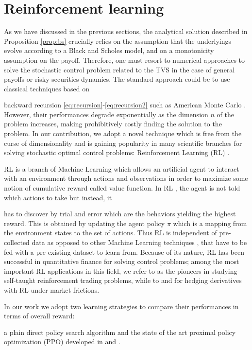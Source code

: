 \documentclass[runningheads]{m2ef}
\newcommand\soutpars[1]{\let\helpcmd\sout\parhelp#1\par\relax\relax}
\newcommand{\change}[1]{{\color{red} {#1}}}%
\newcommand{\remove}[1]{{\color{red} \soutpars{{#1}}}}%
\begin{document}
\section{Reinforcement learning}\label{sec:RL}
As we have discussed in the previous sections, \change{the analytical solution described in Proposition \ref{prop:bs} crucially relies on the assumption that the underlyings evolve according to a Black and Scholes model, and on a monotonicity assumption on the payoff. Therefore,}
one must resort to numerical approaches to solve the stochastic control problem related to the TVS in the case of general payoffs or risky securities dynamics. The standard approach could be to use classical techniques based on \remove{backwards} \change{backward} recursion \eqref{eq:recursion}-\eqref{eq:recursion2} such as American Monte Carlo \cite{Longstaff2001}. However, their performances degrade exponentially as the dimension $n$ of the problem increases, making prohibitively costly finding the solution to the problem. In our contribution, we adopt a novel technique which is free from the curse of dimensionality and is gaining popularity in many scientific branches for solving stochastic optimal control problems: Reinforcement Learning (RL) \cite{Sutton2018}. 

\remove{Reinforcement Learning} \change{RL} is a branch of Machine Learning which allows an artificial agent to interact with an environment through actions and observations in order to maximize some notion of cumulative reward \change{called value function}. In RL\change{,} the agent is not told which actions to take but instead, it \remove{must} \change{has to} discover by trial and error which are the behaviors  yielding the highest reward. This is obtained by updating the agent policy $\pi$ which is a mapping from the environment states to the set of actions. Thus RL is independent of pre-collected data as opposed to other Machine Learning techniques\change{, that have to be fed with a pre-existing dataset to learn from}. Because of its nature, RL has been successful in quantitative finance for solving control problems; among the most important RL applications in this field, we refer to \cite{Deng2017} as the pioneers in studying self-taught reinforcement trading problems, while to \cite{Halperin2020} and \cite{Kolm2019} for hedging derivatives with RL under market frictions.

In our work we adopt two learning strategies to compare their performances in terms of overall reward: \remove{an \textit{ad hoc}} \change{a plain} direct policy \change{search} algorithm \change{\cite{Sutton2018}} and the state of the art proximal policy optimization (PPO) developed in \cite{Schulman2017} and \cite{Schulman2016}. 
\end{document}
